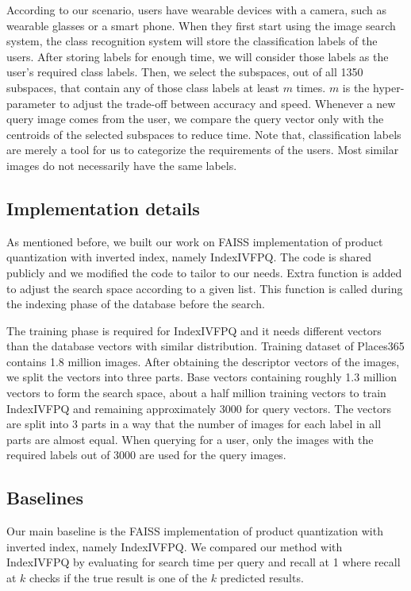 According to our scenario, users have wearable devices with a camera, such as wearable glasses or a smart phone. 
When they first start using the image search system, the class recognition system will store the classification labels of the users. 
After storing labels for enough time, we will consider those labels as the user's required class labels.
Then, we select the subspaces, out of all 1350 subspaces, that contain any of those class labels at least $m$ times. 
$m$ is the hyper-parameter to adjust the trade-off between accuracy and speed.
Whenever a new query image comes from the user, we compare the query vector only with the centroids of the selected subspaces to reduce time.
Note that, classification labels are merely a tool for us to categorize the requirements of the users.
Most similar images do not necessarily have the same labels.


\subsection{Implementation details}

As mentioned before, we built our work on FAISS implementation\cite{faiss} of product quantization with inverted index, namely IndexIVFPQ. 
The code is shared publicly and we modified the code to tailor to our needs.
Extra function is added to adjust the search space according to a given list. 
This function is called during the indexing phase of the database before the search.

The training phase is required for IndexIVFPQ and it needs different vectors than the database vectors with similar distribution.
Training dataset of Places365 contains 1.8 million images. 
After obtaining the descriptor vectors of the images, we split the vectors into three parts.
Base vectors containing roughly 1.3 million vectors to form the search space, about a half million training vectors to train IndexIVFPQ and remaining approximately 3000 for query vectors.
The vectors are split into 3 parts in a way that the number of images for each label in all parts are almost equal.
When querying for a user, only the images with the required labels out of 3000 are used for the query images.

\subsection{Baselines}

Our main baseline is the FAISS implementation\cite{faiss} of product quantization with inverted index, namely IndexIVFPQ.
We compared our method with IndexIVFPQ by evaluating for search time per query and recall at 1 where recall at $k$ checks if the true result is one of the $k$ predicted results.

